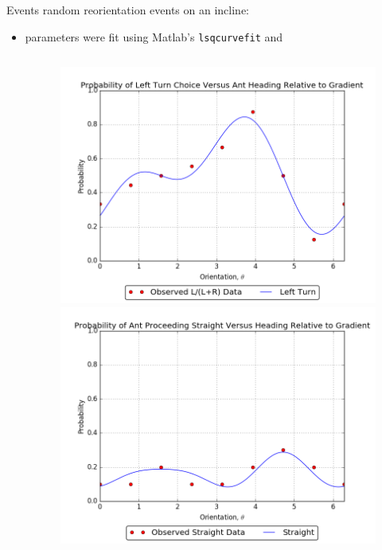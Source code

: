 \begin{frame}{Events}
\alert{random reorientation events on an incline:}
\begin{itemize}
     \item parameters were fit using Matlab's \texttt{lsqcurvefit} and  \scriptsize{\cite{khuong_how_2013}}
\end{itemize}
\begin{figure}
\begin{columns}[T,onlytextwidth]
\column{\textwidth}
\begin{minipage}[]{0.05\textwidth}
~
\end{minipage}%
\begin{minipage}[]{0.315\textwidth}
    \includegraphics[width=\textwidth]{images/l_choice} \\
    \includegraphics[width = \textwidth]{images/s_choice}

\end{minipage}
\end{columns}
\end{figure}
\end{frame}
